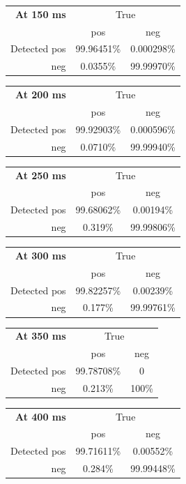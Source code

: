 \documentclass[10pt,letterpaper]{article}
\begin{document}
\vspace{8pt}\par\noindent
\begin{tabular}{r|cc}
  {\bf At 150 ms} & \multicolumn{2}{c}{True} \\ 
  & pos & neg \\ 
  \hline  Detected pos & 99.96451\% & 0.000298\%\\ 
  neg & 0.0355\% & 99.99970\%\\ 
\end{tabular}
\vspace{8pt}\par\noindent
\begin{tabular}{r|cc}
  {\bf At 200 ms} & \multicolumn{2}{c}{True} \\ 
  & pos & neg \\ 
  \hline  Detected pos & 99.92903\% & 0.000596\%\\ 
  neg & 0.0710\% & 99.99940\%\\ 
\end{tabular}
\vspace{8pt}\par\noindent
\begin{tabular}{r|cc}
  {\bf At 250 ms} & \multicolumn{2}{c}{True} \\ 
  & pos & neg \\ 
  \hline  Detected pos & 99.68062\% & 0.00194\%\\ 
  neg & 0.319\% & 99.99806\%\\ 
\end{tabular}
\vspace{8pt}\par\noindent
\begin{tabular}{r|cc}
  {\bf At 300 ms} & \multicolumn{2}{c}{True} \\ 
  & pos & neg \\ 
  \hline  Detected pos & 99.82257\% & 0.00239\%\\ 
  neg & 0.177\% & 99.99761\%\\ 
\end{tabular}
\vspace{8pt}\par\noindent
\begin{tabular}{r|cc}
  {\bf At 350 ms} & \multicolumn{2}{c}{True} \\ 
  & pos & neg \\ 
  \hline  Detected pos & 99.78708\% & 0\\ 
  neg & 0.213\% & 100\%\\ 
\end{tabular}
\vspace{8pt}\par\noindent
\begin{tabular}{r|cc}
  {\bf At 400 ms} & \multicolumn{2}{c}{True} \\ 
  & pos & neg \\ 
  \hline  Detected pos & 99.71611\% & 0.00552\%\\ 
  neg & 0.284\% & 99.99448\%\\ 
\end{tabular}
\vspace{8pt}\par\noindent
\end{document}
